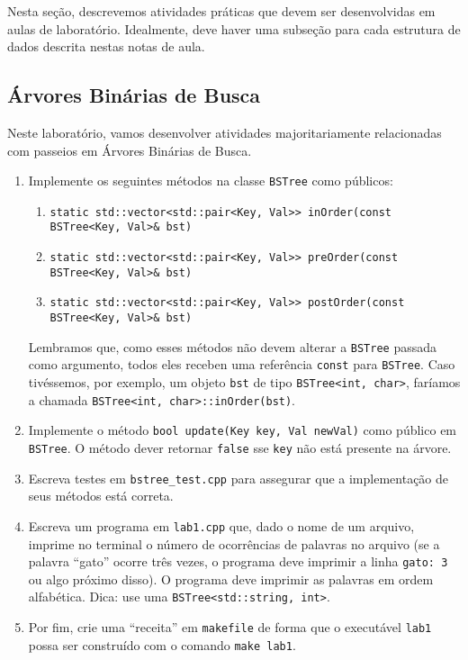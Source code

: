 \documentclass[11pt]{article}
\begin{document}
Nesta seção, descrevemos atividades práticas que devem ser
desenvolvidas em aulas de laboratório.  Idealmente, deve haver uma
subseção para cada estrutura de dados descrita nestas notas de aula.

\subsection{Árvores Binárias de Busca}
\label{sec:orga596f7c}

Neste laboratório, vamos desenvolver atividades majoritariamente
relacionadas com passeios em Árvores Binárias de Busca.

\begin{enumerate}
\item Implemente os seguintes métodos na classe \texttt{BSTree} como
públicos:
\begin{enumerate}
\item \texttt{static std::vector<std::pair<Key, Val>> inOrder(const BSTree<Key, Val>\& bst)}
\item \texttt{static std::vector<std::pair<Key, Val>> preOrder(const BSTree<Key, Val>\& bst)}
\item \texttt{static std::vector<std::pair<Key, Val>> postOrder(const BSTree<Key, Val>\& bst)}
\end{enumerate}
Lembramos que, como esses métodos não devem alterar a \texttt{BSTree}
passada como argumento, todos eles receben uma referência
\texttt{const} para \texttt{BSTree}.  Caso tivéssemos, por exemplo, um objeto
\texttt{bst} de tipo \texttt{BSTree<int, char>}, faríamos a chamada
\texttt{BSTree<int, char>::inOrder(bst)}.
\item Implemente o método \texttt{bool update(Key key, Val newVal)} como
público em \texttt{BSTree}.  O método dever retornar \texttt{false} sse \texttt{key}
não está presente na árvore.
\item Escreva testes em \texttt{bstree\_test.cpp} para assegurar que a
implementação de seus métodos está correta.
\item Escreva um programa em \texttt{lab1.cpp} que, dado o nome de um
arquivo, imprime no terminal o número de ocorrências de palavras
no arquivo (se a palavra ``gato'' ocorre três vezes, o programa
deve imprimir a linha \texttt{gato: 3} ou algo próximo disso). O
programa deve imprimir as palavras em ordem alfabética.  Dica:
use uma \texttt{BSTree<std::string, int>}.
\item Por fim, crie uma ``receita'' em \texttt{makefile} de forma que o
executável \texttt{lab1} possa ser construído com o comando \texttt{make
      lab1}.
\end{enumerate}
\end{document}
